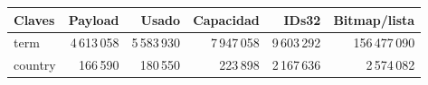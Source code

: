 \begin{tabular}{lrrrrr}
\toprule
Claves & Payload & Usado & Capacidad & IDs32 & Bitmap/lista \\
\midrule
term & 4\,613\,058 & 5\,583\,930 & 7\,947\,058 & 9\,603\,292 & 156\,477\,090 \\
country & 166\,590 & 180\,550 & 223\,898 & 2\,167\,636 & 2\,574\,082 \\
\bottomrule
\end{tabular}
